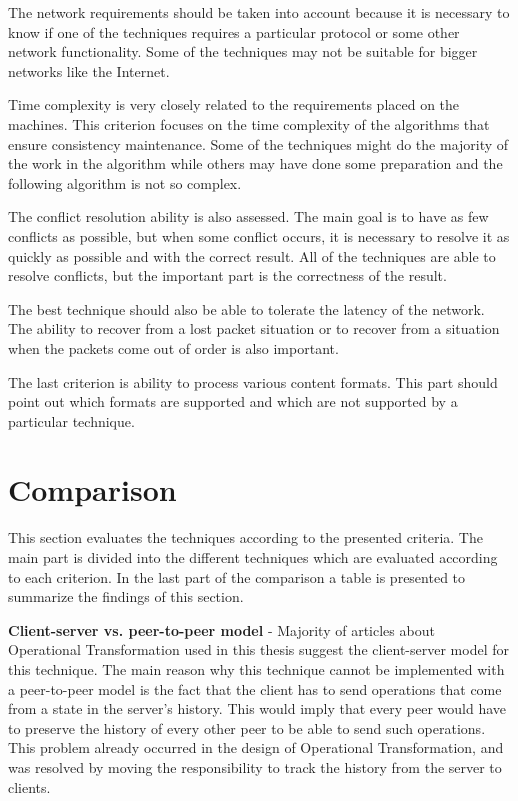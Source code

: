 \documentclass[12pt,oneside]{fithesis2}
\begin{document}
\par The network requirements should be taken into account because it is necessary to know if one of the techniques requires a particular protocol or some other network functionality. Some of the techniques may not be suitable for bigger networks like the Internet.
\par Time complexity is very closely related to the requirements placed on the machines. This criterion focuses on the time complexity of the algorithms that ensure consistency maintenance. Some of the techniques might do the majority of the work in the algorithm while others may have done some preparation and the following algorithm is not so complex.
\par The conflict resolution ability is also assessed. The main goal is to have as few conflicts as possible, but when some conflict occurs, it is necessary to resolve it as quickly as possible and with the correct result. All of the techniques are able to resolve conflicts, but the important part is the correctness of the result. 
\par The best technique should also be able to tolerate the latency of the network. The ability to recover from a lost packet situation or to recover from a situation when the packets come out of order is also important. 
\par The last criterion is ability to process various content formats. This part should point out which formats are supported and which are not supported by a particular technique.
\section{Comparison}
\par This section evaluates the techniques according to the presented criteria. The main part is divided into the different techniques which are evaluated according to each criterion. In the last part of the comparison a table  is presented to summarize the findings of this section.
\\
\par \textbf{\underline{}}

\vspace{3mm}

\textbf{Client-server vs. peer-to-peer model} - Majority of articles about Operational Transformation used in this thesis suggest the client-server model for this technique. The main reason why this technique cannot be implemented with a peer-to-peer model is the fact that the client has to send operations that come from a state in the server's history. This would imply that every peer would have to preserve the history of every other peer to be able to send such operations. This problem already occurred in the design of Operational Transformation, and was resolved by moving the responsibility to track the history from the server to clients.
\end{document}
